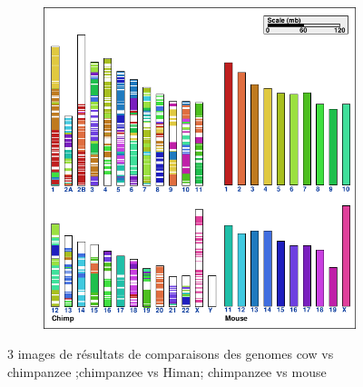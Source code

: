 \begin{figure}[!h]
\begin{subfigure}[b]{0.14\textwidth}
\end{subfigure}
\begin{subfigure}[b]{0.13\textwidth}
\includegraphics[width=\textwidth]{imag/graph3_chim_mouse1}
\end{subfigure}
\caption{3 images de r\'{e}sultats de comparaisons des genomes cow vs chimpanzee ;chimpanzee vs Himan; chimpanzee vs mouse}
\end{figure}
